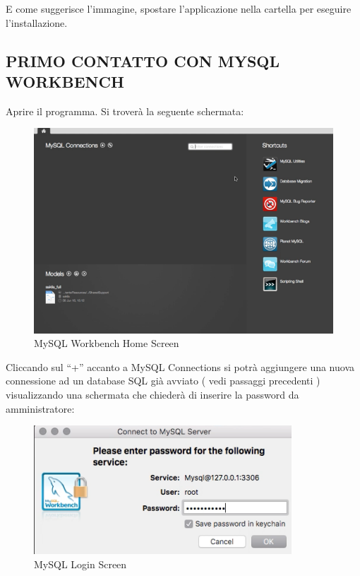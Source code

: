 \begin{itemize}
E come suggerisce l’immagine, spostare l’applicazione nella cartella per eseguire l’installazione.

\end{itemize}

\subsection{PRIMO CONTATTO CON MYSQL WORKBENCH}

Aprire il programma. Si troverà la seguente schermata:

\begin{center}
\begin{figure}[H]
\centering
\includegraphics[scale=0.8]{figures/mySQL_workbench_home.png}
\caption{MySQL Workbench Home Screen}
\end{figure}
\end{center}

Cliccando sul “+” accanto a MySQL Connections si potrà aggiungere una nuova connessione ad un database SQL già avviato ( vedi passaggi precedenti ) visualizzando una schermata che chiederà di inserire la password da amministratore:  

\begin{center}
\begin{figure}[H]
\centering
\includegraphics[scale=1]{figures/mySQL_login.png}
\caption{MySQL Login Screen}
\end{figure}
\end{center}


